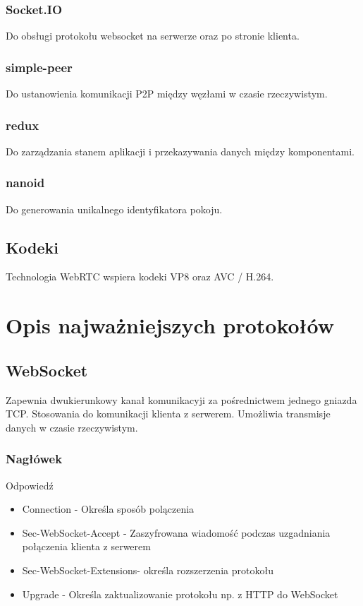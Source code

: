 \documentclass{article}
\begin{document}
\subsubsection{Socket.IO}
Do obsługi protokołu websocket na serwerze oraz po stronie klienta.

\subsubsection{simple-peer}
Do ustanowienia komunikacji P2P między węzłami w czasie rzeczywistym.

\subsubsection{redux}
Do zarządzania stanem aplikacji i przekazywania danych między komponentami.

\subsubsection{nanoid}
Do generowania unikalnego identyfikatora pokoju.

\subsection{Kodeki}
Technologia WebRTC wspiera kodeki VP8 oraz AVC / H.264.

\section{Opis najważniejszych protokołów}

\subsection{WebSocket}
Zapewnia dwukierunkowy kanał komunikacyji za pośrednictwem jednego gniazda TCP. Stosowania do komunikacji klienta z serwerem. Umożliwia transmisje danych w czasie rzeczywistym.

\subsubsection{Nagłówek}

Odpowiedź
\begin{itemize}
  \item Connection - Określa sposób polączenia
  \item Sec-WebSocket-Accept - Zaszyfrowana wiadomość podczas uzgadniania połączenia klienta z serwerem
  \item Sec-WebSocket-Extensions- określa rozszerzenia protokołu
  \item Upgrade - Określa zaktualizowanie protokołu np. z HTTP do WebSocket
\end{itemize}
\end{document}

